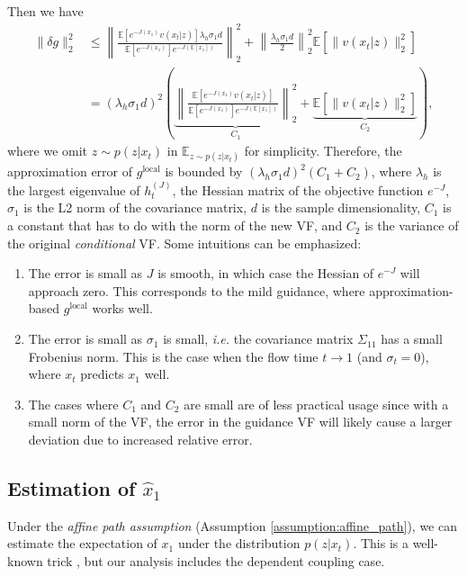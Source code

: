 Then we have
\begin{align}
    \nonumber \|\delta g\|^2_2 &\le \left\|  \frac{\mathbb{E}[e^{-J(x_1)}v(x_t|z)]\lambda_h\sigma_1 d}{\mathbb{E}[e^{-J(x_1)}]e^{-J(\mathbb{E}[x_1])}} \right\|_2^2
    + \left\|\frac{\lambda_h \sigma_1 d}{2} \right\|^2_2 \mathbb{E}\left[\|v(x_t|z)\|_2^2\right] \\
    & = (\lambda_h \sigma_1 d)^2
    \left( 
    \underbrace{\left\|  \frac{\mathbb{E}[e^{-J(x_1)}v(x_t|z)]}{\mathbb{E}[e^{-J(x_1)}]e^{-J(\mathbb{E}[{x}_1])}} \right\|_2^2}_{C_1} + \underbrace{\mathbb{E}\left[\|v(x_t|z)\|_2^2\right]}_{C_2}
    \right),
\end{align}
where we omit $z\sim p(z|x_t)$ in $\mathbb{E}_{z\sim p(z|x_t)}$ for simplicity.
Therefore, the approximation error of $g^{\text{local}}$ is bounded by $(\lambda_h \sigma_1 d)^2 (C_1 + C_2)$, where $\lambda_h$ is the largest eigenvalue of $h_t^{(J)}$, the Hessian matrix of the objective function $e^{-J}$, $\sigma_1$ is the L2 norm of the covariance matrix, $d$ is the sample dimensionality, $C_1$ is a constant that has to do with the norm of the new VF, and $C_2$ is the variance of the original \emph{conditional} VF. Some intuitions can be emphasized:
\begin{enumerate}
    \item The error is small as $J$ is smooth, in which case the Hessian of $e^{-J}$ will approach zero. This corresponds to the mild guidance, where approximation-based $g^{\text{local}}$ works well.
    \item The error is small as $\sigma_1$ is small, \emph{i.e.} the covariance matrix $\Sigma_{11}$ has a small Frobenius norm. This is the case when the flow time $t\rightarrow 1$ (and $\sigma_t = 0$), where $x_t$ predicts $x_1$ well.
    \item The cases where $C_1$ and $C_2$ are small are of less practical usage since with a small norm of the VF, the error in the guidance VF will likely cause a larger deviation due to increased relative error.
\end{enumerate}


\subsection{Estimation of $\hat{x}_1$}
\label{appendix:x1_parameterization}
Under the \emph{affine path assumption} (Assumption \ref{assumption:affine_path}), we can estimate the expectation of $x_1$ under the distribution $p(z|x_t)$. This is a well-known trick \citep{lipman_flow_2024,pokle_training-free_2024}, but our analysis includes the dependent coupling case.


